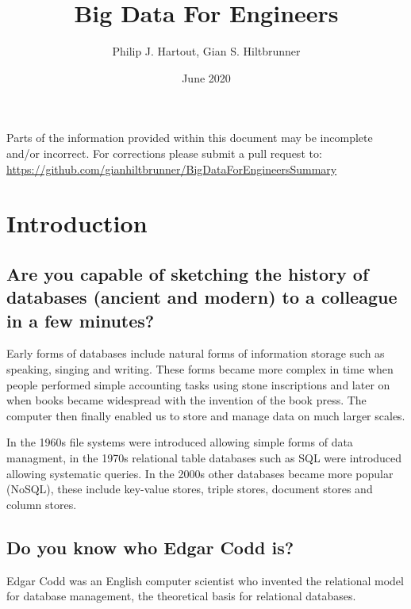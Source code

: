 \documentclass{article}
\title{Big Data For Engineers}
\author{Philip J. Hartout, Gian S. Hiltbrunner}
\date{June 2020}
\begin{document}

\maketitle

\begin{center}
    \color{red}
    \begin{framed}
    \noindent Parts of the information provided within this document may be incomplete and/or incorrect. For corrections please submit a pull request to:
    \url{https://github.com/gianhiltbrunner/BigDataForEngineersSummary}
    \end{framed}
\end{center}

\tableofcontents

\section{Introduction}
\subsection{Are you capable of sketching the history of databases (ancient and modern) to a colleague in a few minutes?}

Early forms of databases include natural forms of information storage such as speaking, singing and writing. These forms became more complex in time when people performed simple accounting tasks using stone inscriptions and later on when books became widespread with the invention of the book press. The computer then finally enabled us to store and manage data on much larger scales.

In the 1960s file systems were introduced allowing simple forms of data managment, in the 1970s relational table databases such as SQL were introduced allowing systematic queries. In the 2000s other databases became more popular (NoSQL), these include key-value stores, triple stores, document stores and column stores.

\subsection{Do you know who Edgar Codd is?}

Edgar Codd was an English computer scientist who invented the relational model for database management, the theoretical basis for relational databases.
\end{document}
